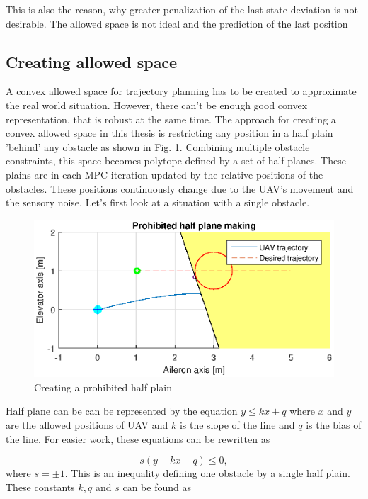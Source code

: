 \documentclass[a4paper,11pt,titlepage]{article}
\begin{document}
This is also the reason, why greater penalization of the last state deviation is not desirable. The allowed space is not ideal and the prediction of the last position 

\subsection{Creating allowed space}


A convex allowed space for trajectory planning has to be created to approximate the real world situation. However, there can't be enough good convex representation, that is robust at the same time. The approach for creating a convex allowed space in this thesis is restricting any position in a half plain 'behind' any obstacle as shown in Fig. \ref{fig:half_plain}. Combining multiple obstacle constraints, this space becomes polytope defined by a set of half planes. These plains are in each MPC iteration updated by the relative positions of the obstacles. These positions continuously change due to the UAV's movement and the sensory noise. Let's first look at a situation with a single obstacle. 

\begin{figure}[h]
\centering
\includegraphics[width=1\textwidth]{fig/half_plain_making.eps} 
\caption{Creating a prohibited half plain}
\label{fig:half_plain}
\end{figure}

Half plane can be can be represented by the equation $y \leq kx + q$  where $x$ and $y$ are the allowed positions of UAV and $k$ is the slope of the line and $q$ is the bias of the line. For easier work, these equations can be rewritten as

\begin{equation}
\label{eq:simple_obstacle_cond}
s(y - kx - q) \leq 0,
\end{equation}
where $s = \pm 1$. This is an inequality defining one obstacle by a single half plain. 
These constants $k, q$ and $s$ can be found as 
\end{document}
